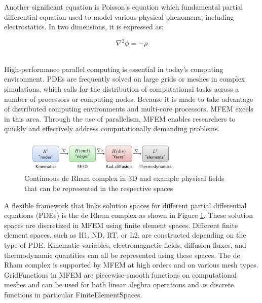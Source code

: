 \documentclass[11pt,a4paper]{article}
\begin{document}
Another significant equation is Poisson's equation which fundamental partial differential equation used to model various physical phenomena, including electrostatics. In two dimensions, it is expressed as:

\begin{equation}
\nabla^2 \phi = -\rho
\end{equation}

\\

High-performance parallel computing is essential in today's computing environment. PDEs are frequently solved on large grids or meshes in complex simulations, which calls for the distribution of computational tasks across a number of processors or computing nodes. Because it is made to take advantage of distributed computing environments and multi-core processors, MFEM excels in this area. Through the use of parallelism, MFEM enables researchers to quickly and effectively address computationally demanding problems.
\\

\begin{figure}[ht]
    \centering
    \includegraphics[width=0.7\textwidth]{hw1_fig1.png}
    \caption{Continuous de Rham complex in 3D and example physical fields that can be represented in the respective spaces}
    \label{fig1}
\end{figure}


A flexible framework that links solution spaces for different partial differential equations (PDEs) is the de Rham complex as shown in Figure \ref{fig1}. These solution spaces are discretized in MFEM using finite element spaces. Different finite element spaces, such as H1, ND, RT, or L2, are constructed depending on the type of PDE. Kinematic variables, electromagnetic fields, diffusion fluxes, and thermodynamic quantities can all be represented using these spaces. The de Rham complex is supported by MFEM at high orders and on various mesh types. GridFunctions in MFEM are piecewise-smooth functions on computational meshes and can be used for both linear alegbra operations and as discrete functions in particular FiniteElementSpaces.

\\
\end{document}
